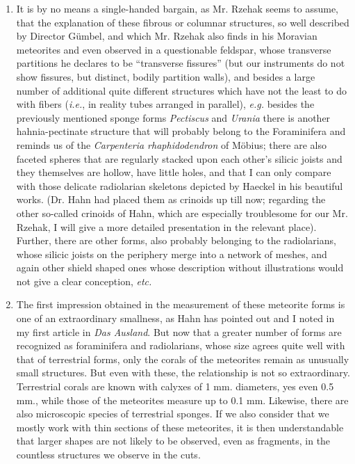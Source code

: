 \documentclass[a4paper, 12pt, oneside]{article}
\begin{document}
\begin{enumerate}
\item It is by no means a single-handed bargain, as Mr. Rzehak seems to assume, that the explanation of these fibrous or columnar structures, so well described by Director Gümbel, and which Mr. Rzehak also finds in his Moravian meteorites and even observed in a questionable feldspar, whose transverse partitions he declares to be ``transverse fissures'' (but our instruments do not show fissures, but distinct, bodily partition walls), and besides a large number of additional quite different structures which have not the least to do with fibers (\emph{i.e.}, in reality tubes arranged in parallel), \emph{e.g.} besides the previously mentioned sponge forms \emph{Pectiscus} and \emph{Urania} there is another hahnia-pectinate structure that will probably belong to the Foraminifera and reminds us of the \emph{Carpenteria rhaphidodendron} of Möbius; there are also faceted spheres that are regularly stacked upon each other's silicic joists and they themselves are hollow, have little holes, and that I can only compare with those delicate radiolarian skeletons depicted by Haeckel in his beautiful works. (Dr. Hahn had placed them as crinoids up till now; regarding the other so-called crinoids of Hahn, which are especially troublesome for our Mr. Rzehak, I will give a more detailed presentation in the relevant place). Further, there are other forms, also probably belonging to the radiolarians, whose silicic joists on the periphery merge into a network of meshes, and again other shield shaped ones whose description without illustrations would not give a clear conception, \emph{etc.}
\item The first impression obtained in the measurement of these meteorite forms is one of an extraordinary smallness, as Hahn has pointed out and I noted in my first article in \emph{Das Ausland}. But now that a greater number of forms are recognized as foraminifera and radiolarians, whose size agrees quite well with that of terrestrial forms, only the corals of the meteorites remain as unusually small structures. But even with these, the relationship is not so extraordinary. Terrestrial corals are known with calyxes of 1 mm. diameters, yes even 0.5 mm., while those of the meteorites measure up to 0.1 mm. Likewise, there are also microscopic species of terrestrial sponges. If we also consider that we mostly work with thin sections of these meteorites, it is then understandable that larger shapes are not likely to be observed, even as fragments, in the countless structures we observe in the cuts.

\end{enumerate}
\end{document}

